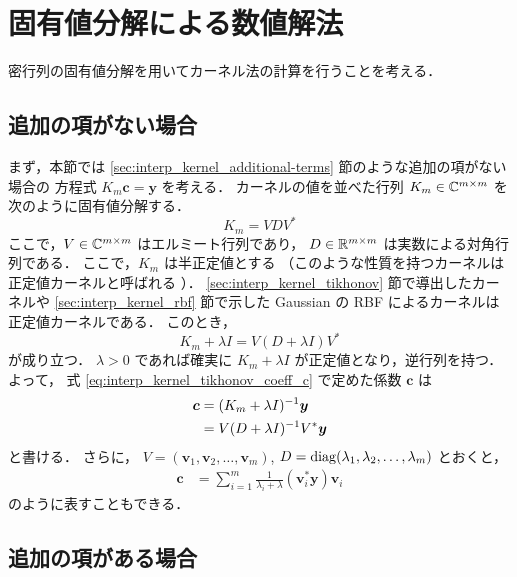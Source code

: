 %

\section{固有値分解による数値解法}\label{sec:interp_kernel_evd-computation}

密行列の固有値分解を用いてカーネル法の計算を行うことを考える．

\subsection{追加の項がない場合}

まず，本節では \ref{sec:interp_kernel_additional-terms} 節のような追加の項がない場合の
方程式 $K_m \bm{c} = \bm{y}$ を考える．
カーネルの値を並べた行列 $K_m \in \mathbb{C}^{m \times m}$ を次のように固有値分解する．
\begin{equation}
    K_m = V D V^*
\end{equation}
ここで，$V \in \mathbb{C}^{m \times m}$ はエルミート行列であり，
$D \in \mathbb{R}^{m \times m}$ は実数による対角行列である．
ここで，$K_m$ は半正定値とする
（このような性質を持つカーネルは正定値カーネルと呼ばれる \cite{Fukumizu2010}）．
\ref{sec:interp_kernel_tikhonov} 節で導出したカーネルや
\ref{sec:interp_kernel_rbf} 節で示した Gaussian の RBF によるカーネルは
正定値カーネルである．
このとき，
\begin{equation}
    K_m + \lambda I = V (D + \lambda I) V^*
\end{equation}
が成り立つ．
$\lambda > 0$ であれば確実に $K_m + \lambda I$ が正定値となり，逆行列を持つ．
よって，
式 \eqref{eq:interp_kernel_tikhonov_coeff_c} で定めた係数 $\bm{c}$ は
\begin{align}
    \bm{c}
     & = (K_m + \lambda I)^{-1} \bm{y} \notag \\
     & = V (D + \lambda I)^{-1} V^* \bm{y}
\end{align}
と書ける．
さらに，
$V = (\bm{v}_1, \bm{v}_2, \ldots, \bm{v}_m)$,
$D = \operatorname{diag}(\lambda_1, \lambda_2, \ldots, \lambda_m)$
とおくと，
\begin{align}
    \bm{c}
     & = \sum_{i=1}^m \frac{1}{\lambda_i + \lambda} (\bm{v}_i^* \bm{y}) \bm{v}_i
\end{align}
のように表すこともできる．

\subsection{追加の項がある場合}

